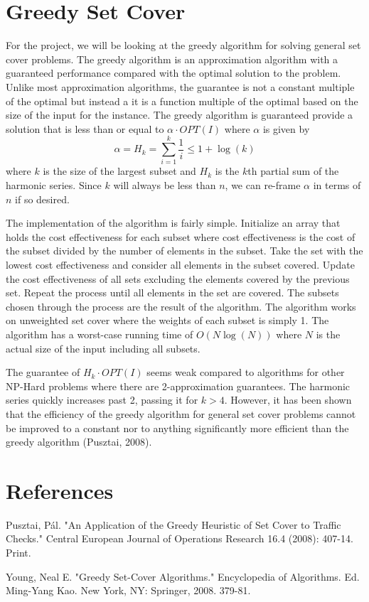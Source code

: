 \documentclass{article}
\begin{document}
\section{Greedy Set Cover}
For the project, we will be looking at the greedy algorithm for solving general set cover problems. The greedy algorithm is an approximation algorithm with a guaranteed performance compared with the optimal solution to the problem. Unlike most approximation algorithms, the guarantee is not a constant multiple of the optimal but instead a it is a function multiple of the optimal based on the size of the input for the instance. The greedy algorithm is guaranteed provide a solution that is less than or equal to $\alpha \cdot OPT(I)$ where $\alpha$ is given by $$\alpha = H_k = \sum_{i=1}^k \frac{1}{i}\leq 1+\log(k)$$ where $k$ is the size of the largest subset and $H_k$ is the $k$th partial sum of the harmonic series. Since $k$ will always be less than $n$, we can re-frame $\alpha$ in terms of $n$ if so desired.

The implementation of the algorithm is fairly simple. Initialize an array that holds the cost effectiveness for each subset where cost effectiveness is the cost of the subset divided by the number of elements in the subset. Take the set with the lowest cost effectiveness and consider all elements in the subset covered. Update the cost effectiveness of all sets excluding the elements covered by the previous set. Repeat the process until all elements in the set are covered. The subsets chosen through the process are the result of the algorithm. The algorithm works on unweighted set cover where the weights of each subset is simply 1. The algorithm has a worst-case running time of $O(N\log(N))$ where $N$ is the actual size of the input including all subsets.

The guarantee of $H_k\cdot OPT(I)$ seems weak compared to algorithms for other NP-Hard problems where there are 2-approximation guarantees. The harmonic series quickly increases past 2, passing it for $k>4$. However, it has been shown that the efficiency of the greedy algorithm for general set cover problems cannot be improved to a constant nor to anything significantly more efficient than the greedy algorithm (Pusztai, 2008).

\section{References}
Pusztai, Pál. "An Application of the Greedy Heuristic of Set Cover to Traffic Checks." Central European Journal of Operations Research 16.4 (2008): 407-14. Print.

Young, Neal E. "Greedy Set-Cover Algorithms." Encyclopedia of Algorithms. Ed. Ming-Yang Kao. New York, NY: Springer, 2008. 379-81.
\end{document}
